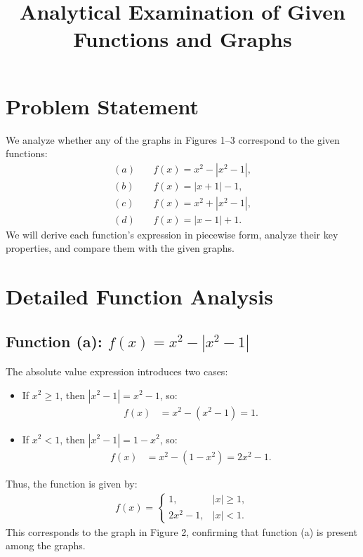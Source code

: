 \documentclass{article}
\begin{document}
\title{Analytical Examination of Given Functions and Graphs}
\author{}
\date{}
\maketitle

\section{Problem Statement}

We analyze whether any of the graphs in Figures 1--3 correspond to the given functions:
\begin{align*}
    (a) & \quad f(x) = x^2 - |x^2 - 1|, \\
    (b) & \quad f(x) = |x + 1| - 1, \\
    (c) & \quad f(x) = x^2 + |x^2 - 1|, \\
    (d) & \quad f(x) = |x - 1| + 1.
\end{align*}
We will derive each function's expression in piecewise form, analyze their key properties, and compare them with the given graphs.

\section{Detailed Function Analysis}

\subsection{Function (a): $f(x) = x^2 - |x^2 - 1|$}

The absolute value expression introduces two cases:
\begin{itemize}
    \item If $x^2 \geq 1$, then $|x^2 - 1| = x^2 - 1$, so:
    \begin{align*}
        f(x) &= x^2 - (x^2 - 1) = 1.
    \end{align*}
    \item If $x^2 < 1$, then $|x^2 - 1| = 1 - x^2$, so:
    \begin{align*}
        f(x) &= x^2 - (1 - x^2) = 2x^2 - 1.
    \end{align*}
\end{itemize}
Thus, the function is given by:
\begin{align*}
    f(x) = \begin{cases} 1, & |x| \geq 1, \\ 2x^2 - 1, & |x| < 1. \end{cases}
\end{align*}
This corresponds to the graph in Figure 2, confirming that function (a) is present among the graphs.
\end{document}
